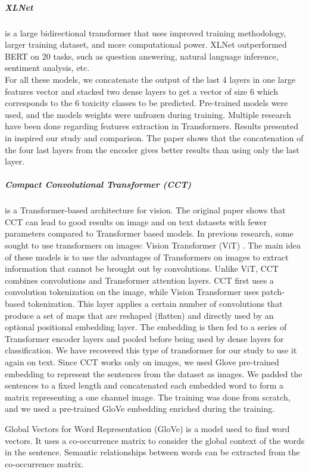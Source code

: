 \documentclass[a4paper,english]{rnti}
\begin{document}
\subparagraph{XLNet} \citep{43} is a large bidirectional transformer that uses improved
training methodology, larger training dataset, and more
computational power. XLNet outperformed BERT on 20 tasks, such as question
answering, natural language inference, sentiment
analysis, etc.\\

For all these models, we concatenate the output of the last 4 layers in one large features vector and stacked two dense layers to get a vector of size 6 which corresponds to the 6 toxicity classes to be predicted. Pre-trained models were used, and the models weights were unfrozen during training.
Multiple research have been done regarding features extraction in Transformers. Results presented in \citep{33} inspired our study and comparison. The paper shows that the concatenation of the four last layers from the encoder gives better results than using only the last layer.

\subparagraph{Compact Convolutional Transformer (CCT)} \citep{44} is a Transformer-based architecture for vision. The original paper shows that CCT can lead to good results on image and on text datasets with fewer parameters compared to Transformer based models. In previous research, some sought to use transformers on images: Vision Transformer (ViT) \citep{dosovitskiy2020vit}. The main idea of these models is to use the advantages of Transformers on images to extract information that cannot be brought out by convolutions. Unlike ViT, CCT combines convolutions and Transformer attention layers. CCT first uses a convolution tokenization on the image, while Vision Transformer uses patch-based tokenization. This layer applies a certain number of convolutions that produce a set of maps that are reshaped (flatten) and directly used by an optional positional embedding layer. The embedding is then fed to a series of Transformer encoder layers and pooled before being used by dense layers for classification.
We have recovered this type of transformer for our study to use it again on text. Since CCT works only on images, we used Glove pre-trained embedding to represent the sentences from the dataset as images. We padded the sentences to a fixed length and concatenated each embedded word to form a matrix representing a one channel image.
The training was done from scratch, and we used a pre-trained GloVe embedding enriched during the training.

 Global Vectors for Word Representation (GloVe) \citep{pennington-etal-2014-glove} is a model used to find word vectors. It uses a co-occurrence matrix to consider the global context of the words in the sentence. Semantic relationships between words can be extracted from the co-occurrence matrix.
\end{document}
